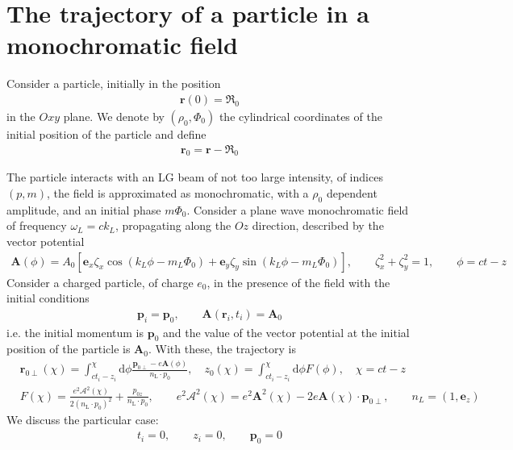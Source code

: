 \section{The trajectory of a particle in a monochromatic field}

Consider a particle, initially in the position
\begin{align}
    {\bm r}(0) = {\boldsymbol{\mathfrak R}}_0
\end{align}
in the $Oxy$ plane. We denote by $(\rho_0, \varPhi_0)$ the cylindrical coordinates of the initial position of the particle and define
\begin{align}
    {\bm r}_0={\bm r}-{\boldsymbol{\mathfrak{R}}_0}
\end{align}

The particle interacts with an LG beam of not too large intensity, of indices $(p,m)$, the field is approximated as monochromatic, with a $\rho_0$ dependent amplitude, and an initial phase $m\varPhi_0$.
Consider a plane wave monochromatic field of frequency $\omega_L=ck_L$, propagating along the $Oz$ direction, described by the vector potential
\begin{align}
    {\bm A}(\phi)=A_0\left[ {\bm e}_x\zeta_x \cos(k_L\phi-m_L\varPhi_0)+{\bm e}_y\zeta_y\sin(k_L\phi-m_L\varPhi_0)\right],\qquad \zeta_x^2+\zeta_y^2=1,\qquad \phi=ct-z
\end{align}
Consider a charged particle, of charge $e_0$, in the presence of the field with the initial conditions
\begin{align}
    {\bm p}_i={\bm p}_0, \qquad{\bm A}({\bm r}_i,t_i)={\bm A}_0
\end{align}
i.e. the initial momentum is ${\bm p}_0$ and the value of the vector potential at the initial position of the particle is ${\bm A}_0$. With these, the trajectory is
\begin{align}
     & \bm{r}_{0\perp}(\chi)=\int_{c t_i-z_i}^\chi \mathrm{d} \phi \frac{\bm{p}_{0 \perp}-e \bm{A}(\phi)}{n_{\mathrm{L}} \cdot p_0}, \quad z_0(\chi)=\int_{c t_i-z_i}^\chi \mathrm{d} \phi F(\phi),\quad \chi = ct-z\nonumber                                      \\
     & F(\chi) =\frac{e^2 \mathcal{A}^2(\chi)}{2\left(n_{\mathrm{L}} \cdot p_0\right)^2}+\frac{p_{0 z}}{n_{\mathrm{L}} \cdot p_0}, \qquad e^2 \mathcal{A}^2(\chi)=e^2 \mathbf{A}^2(\chi)-2 e \mathbf{A}(\chi) \cdot \mathbf{p}_{0 \perp}, \qquad n_L=(1,{\bm e}_z)
\end{align}
We discuss the particular case:
\begin{align}
    t_i=0,\qquad z_i=0,\qquad {\bm p}_0 = 0
\end{align}
